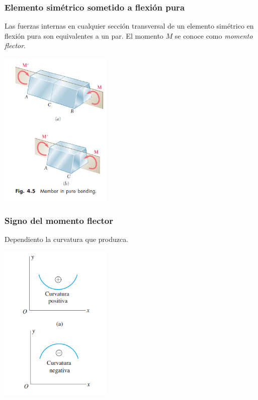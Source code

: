 \documentclass{beamer}
\begin{document}
\begin{frame}
\justifying
\frametitle{Elemento simétrico sometido a flexión pura}

Las fuerzas internas en cualquier sección transversal de un elemento simétrico 
en flexión pura son equivalentes a un par. El momento $M$ se conoce como 
\textit{momento flector}.

\begin{center}
\includegraphics[width=0.4\textwidth]{img/member_pure_bending.PNG}
\end{center}

\end{frame}


\begin{frame}
\justifying
\frametitle{Signo del momento flector}

Dependiento la curvatura que produzca.

\begin{center}
\includegraphics[width=0.4\textwidth]{img/signo_curvatura.PNG}
\end{center}
\end{frame}
\end{document}
